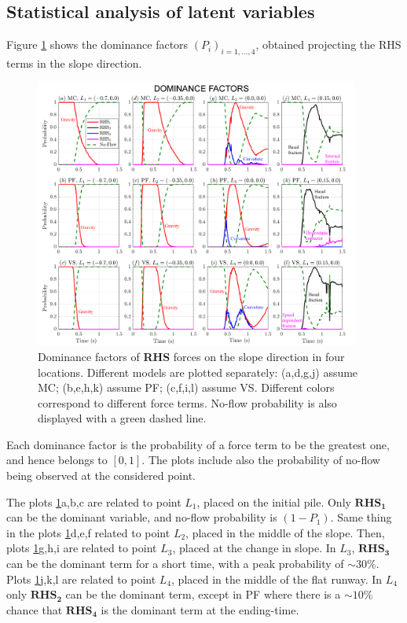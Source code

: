 \documentclass{article}
\begin{document}
\subsection{Statistical analysis of latent variables}\label{Hq1}
Figure \ref{fig:Ramp-Pr_x} shows the dominance factors $(P_i)_{i=1,\dots,4}$, obtained projecting the RHS terms in the slope direction.
\begin{figure}[H]
         \centering
        \includegraphics[width=0.95\textwidth]{InclinedPlane/ForceContrib/Pr_x.png}
        \caption{Dominance factors of \textbf{RHS} forces on the slope direction in four locations. Different models are plotted separately: (a,d,g,j) assume MC; (b,e,h,k) assume PF; (c,f,i,l) assume VS. Different colors correspond to different force terms. No-flow probability is also displayed with a green dashed line.}
        \label{fig:Ramp-Pr_x}
\end{figure}
Each dominance factor is the probability of a force term to be the greatest one, and hence belongs to $[0,1]$. The plots include also the probability of no-flow being observed at the considered point.

The plots \ref{fig:Ramp-Pr_x}a,b,c are related to point $L_1$, placed on the initial pile. Only $\boldsymbol{RHS_1}$ can be the dominant variable, and no-flow probability is $(1-P_1)$. Same thing in the plots \ref{fig:Ramp-Pr_x}d,e,f related to point $L_2$, placed in the middle of the slope. Then, plots \ref{fig:Ramp-Pr_x}g,h,i are related to point $L_3$, placed at the change in slope. In $L_3$, $\boldsymbol{RHS_3}$ can be the dominant term for a short time, with a peak probability of $\sim 30\%$. Plots \ref{fig:Ramp-Pr_x}j,k,l are related to point $L_4$, placed in the middle of the flat runway. In $L_4$ only $\boldsymbol{RHS_2}$ can be the dominant term, except in PF where there is a $\sim 10\%$ chance that $\boldsymbol{RHS_4}$ is the dominant term at the ending-time.
\end{document}
